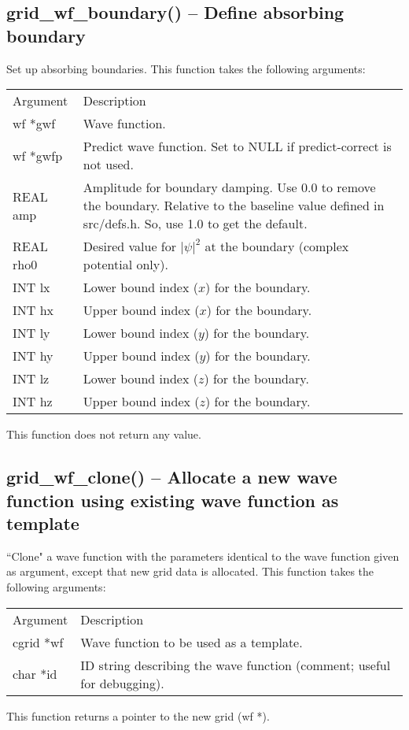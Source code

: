 \documentclass[12pt,letterpaper]{report}
\begin{document}
\subsection{grid\_wf\_boundary() -- Define absorbing boundary}

Set up absorbing boundaries. This function takes the following arguments:
\begin{longtable}{p{} p{}}
Argument & Description\\
\cline{1-2}
wf *gwf & Wave function.\\
wf *gwfp & Predict wave function. Set to NULL if predict-correct is not used.\\
REAL amp & Amplitude for boundary damping. Use 0.0 to remove the boundary. Relative to the baseline value defined in src/defs.h. So, use 1.0 to get the default.\\
REAL rho0 & Desired value for $|\psi|^2$ at the boundary (complex potential only).\\
INT lx & Lower bound index ($x$) for the boundary.\\
INT hx & Upper bound index ($x$) for the boundary.\\
INT ly & Lower bound index ($y$) for the boundary.\\
INT hy & Upper bound index ($y$) for the boundary.\\
INT lz & Lower bound index ($z$) for the boundary.\\
INT hz & Upper bound index ($z$) for the boundary.\\
\end{longtable}
\noindent
This function does not return any value.

\subsection{grid\_wf\_clone() -- Allocate a new wave function using existing wave function as template}

``Clone" a wave function with the parameters identical to the wave function given as argument, except that new grid data is allocated. This function takes the following arguments:
\begin{longtable}{p{} p{}}
Argument & Description\\
\cline{1-2}
cgrid *wf & Wave function to be used as a template.\\
char *id & ID string describing the wave function (comment; useful for debugging).\\
\end{longtable}
\noindent
This function returns a pointer to the new grid (wf *).
\end{document}
